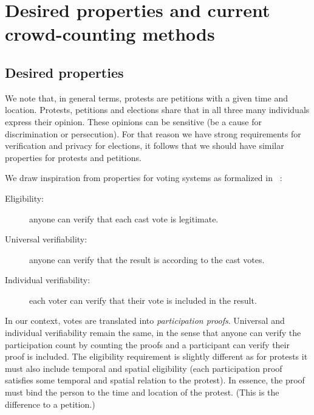 \section{Desired properties and current crowd-counting methods}%
\label{current-crowd-counting}

\subsection{Desired properties}%
\label{desired-properties}

We note that, in general terms, protests are petitions with a given time and 
location.
Protests, petitions and elections share that in all three many individuals 
express their opinion.
These opinions can be sensitive (\eg be a cause for discrimination or 
persecution).
For that reason we have strong requirements for verification and privacy for 
elections, it follows that we should have similar properties for protests
and petitions.

We draw inspiration from properties for voting systems as formalized
in ~\cite{VerifyingPrivacyPropertiesOfVotingProtocols}:
\begin{description}
  \item[Eligibility:] anyone can verify that each cast vote is legitimate.
  \item[Universal verifiability:] anyone can verify that the result is according to the cast votes.
  \item[Individual verifiability:] each voter can verify that their vote is included in the result.
\end{description}
In our context, votes are translated into \emph{participation proofs}.
Universal and individual verifiability remain the same, in the sense that anyone can verify the participation count by counting the proofs and a participant can verify their proof is included.
The eligibility requirement is slightly different as for protests it must also
include temporal %
and spatial eligibility (\ie each participation proof satisfies some temporal 
and spatial relation to the protest).
In essence, the proof must bind the person to the time and location of the protest.
(This is the difference to a petition.)

